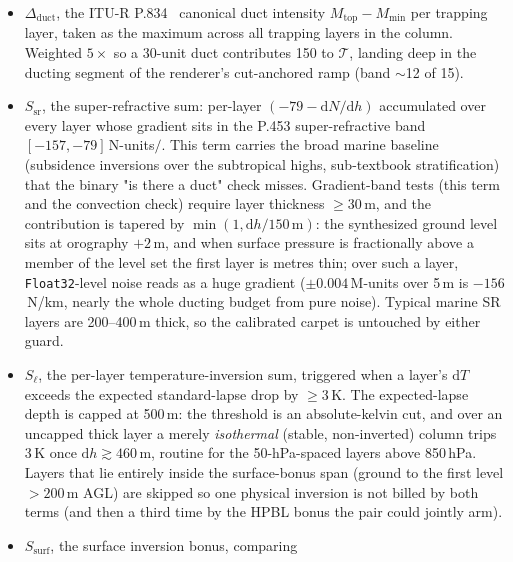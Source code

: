 \documentclass[11pt,a4paper]{article}
\newcommand{\si}[1]{\text{#1}}
\newcommand{\km}{\text{km}}
\begin{document}
\begin{itemize}[nosep]
  \item $\Delta_{\text{duct}}$, the ITU-R P.834~\cite{itup834}
        canonical duct intensity $M_{\text{top}} - M_{\text{min}}$
        per trapping layer, taken as the maximum across all
        trapping layers in the column.  Weighted $5\times$ so a
        30-unit duct contributes 150 to $\mathcal{T}$, landing
        deep in the ducting segment of the renderer's
        cut-anchored ramp (band ${\sim}$12 of 15).
  \item $S_{\text{sr}}$, the super-refractive sum: per-layer
        $(-79 - \mathrm{d}N/\mathrm{d}h)$ accumulated over every
        layer whose gradient sits in the P.453 super-refractive
        band $[-157, -79]$\,N-units$/$\si{\km}.  This term carries
        the broad marine baseline (subsidence inversions over the
        subtropical highs, sub-textbook stratification) that the
        binary "is there a duct" check misses.  Gradient-band
        tests (this term and the convection check) require layer
        thickness $\ge\!30$\,m, and the contribution is tapered
        by $\min(1, \mathrm{d}h/150\,\text{m})$: the synthesized
        ground level sits at orography $+2$\,m, and when surface
        pressure is fractionally above a member of the level set
        the first layer is metres thin; over such a layer,
        \texttt{Float32}-level noise reads as a huge gradient
        ($\pm 0.004$\,M-units over 5\,m is $-156$\,N/km, nearly
        the whole ducting budget from pure noise).  Typical
        marine SR layers are 200--400\,m thick, so the calibrated
        carpet is untouched by either guard.
  \item $S_{\ell}$, the per-layer temperature-inversion sum,
        triggered when a layer's $\mathrm{d}T$ exceeds the
        expected standard-lapse drop by ${\ge}\!3$\,K.  The
        expected-lapse depth is capped at 500\,m: the threshold
        is an absolute-kelvin cut, and over an uncapped thick
        layer a merely \emph{isothermal} (stable, non-inverted)
        column trips 3\,K once $\mathrm{d}h \gtrsim 460$\,m,
        routine for the 50-hPa-spaced layers above 850\,hPa.
        Layers that lie entirely inside the surface-bonus span
        (ground to the first level $>\!200$\,m AGL) are skipped
        so one physical inversion is not billed by both terms
        (and then a third time by the HPBL bonus the pair could
        jointly arm).
  \item $S_{\text{surf}}$, the surface inversion bonus, comparing

\end{itemize}
\end{document}
